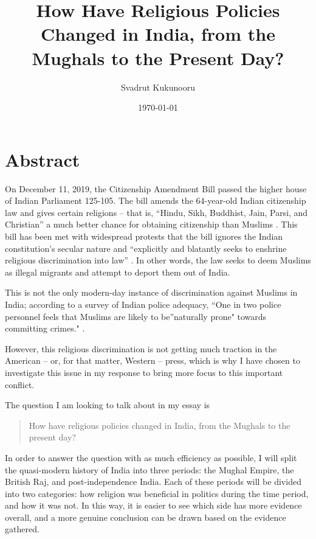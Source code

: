 \documentclass[11pt, letterpaper]{article}
\title{How Have Religious Policies Changed in India, from the Mughals to the Present Day?}\label{religious-discrimination-in-india}
\author{Svadrut Kukunooru}
\date{\today}
\begin{document}
\begin{titlepage}
    \maketitle
\end{titlepage}
\tableofcontents
\newpage
\section{Abstract}\label{abstract}

On December 11, 2019, the Citizenship Amendment Bill passed the higher
house of Indian Parliament 125-105. The bill amends the 64-year-old
Indian citizenship law and gives certain religions -- that is, ``Hindu,
Sikh, Buddhist, Jain, Parsi, and Christian'' a much better chance for
obtaining citizenship than Muslims \cite{BBC}. This bill has been met with
widespread protests that the bill ignores the Indian constitution's
secular nature and ``explicitly and blatantly seeks to enshrine
religious discrimination into law'' \cite{BBC}. In other words, the law
seeks to deem Muslims as illegal migrants and attempt to deport them out
of India.

This is not the only modern-day instance of discrimination against
Muslims in India; according to a survey of Indian police adequacy, ``One
in two police personnel feels that Muslims are likely to be''naturally
prone" towards committing crimes." \cite{police}. 

However, this religious discrimination is not getting much traction in
the American -- or, for that matter, Western -- press, which is why I
have chosen to investigate this issue in my response to bring more focus
to this important conflict.

The question I am looking to talk about in my essay is

\begin{quote}
How have religious policies changed in India, from the Mughals to the
present day?
\end{quote}

In order to answer the question with as much efficiency as possible, I
will split the quasi-modern history of India into three periods: the
Mughal Empire, the British Raj, and post-independence India. Each of
these periods will be divided into two categories: how religion was
beneficial in politics during the time period, and how it was not. In
this way, it is easier to see which side has more evidence overall, and
a more genuine conclusion can be drawn based on the evidence gathered.
\end{document}
